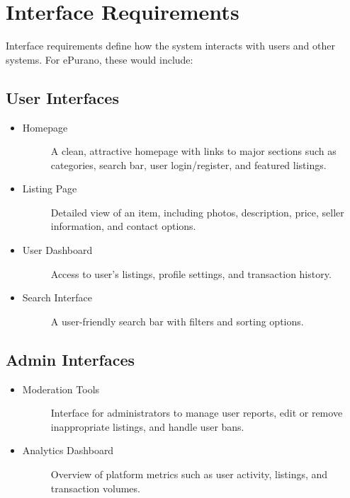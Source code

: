 \section{Interface Requirements}
Interface requirements define how the system interacts with users and other systems. For ePurano, these would include:

\subsection{User Interfaces}
\begin{itemize}
    \item \begin{description}
        \item[Homepage] A clean, attractive homepage with links to major sections such as categories, search bar, user login/register, and featured listings.
    \end{description}
    \item \begin{description}
        \item[Listing Page] Detailed view of an item, including photos, description, price, seller information, and contact options.
    \end{description}
    \item \begin{description}
        \item[User Dashboard] Access to user's listings, profile settings, and transaction history.
    \end{description}
    \item \begin{description}
        \item[Search Interface] A user-friendly search bar with filters and sorting options.
    \end{description}
\end{itemize} 

\subsection{Admin Interfaces}
\begin{itemize}
    \item \begin{description}
        \item[Moderation Tools] Interface for administrators to manage user reports, edit or remove inappropriate listings, and handle user bans.
    \end{description}
    \item \begin{description}
        \item[Analytics Dashboard] Overview of platform metrics such as user activity, listings, and transaction volumes.
    \end{description}
\end{itemize} 


